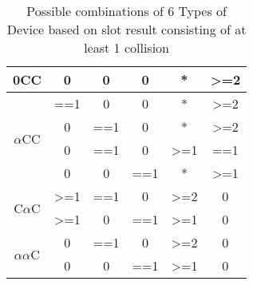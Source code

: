 \documentclass[fleqn]{article}
\begin{document}
\begin {table} [h]
\begin{tabular}{|c|c|c|c|c|c|}
\multicolumn{1}{|c|}{0CC}                                & \multicolumn{1}{c|}{0}                & \multicolumn{1}{c|}{0}                & \multicolumn{1}{c|}{0}   & \multicolumn{1}{c|}{*}                & \multicolumn{1}{c|}{\textgreater{}=2} \\ \hline
\multicolumn{1}{|c|}{\multirow{4}{*}{$\alpha$CC}}        & \multicolumn{1}{c|}{==1}              & \multicolumn{1}{c|}{0}                & \multicolumn{1}{c|}{0}   & \multicolumn{1}{c|}{*}                & \multicolumn{1}{c|}{\textgreater{}=2} \\ \cline{2-6} 
\multicolumn{1}{|c|}{}                                   & \multicolumn{1}{c|}{0}                & \multicolumn{1}{c|}{==1}              & \multicolumn{1}{c|}{0}   & \multicolumn{1}{c|}{*}                & \multicolumn{1}{c|}{\textgreater{}=2} \\ \cline{2-6} 
\multicolumn{1}{|c|}{}                                   & \multicolumn{1}{c|}{0}                & \multicolumn{1}{c|}{==1}              & \multicolumn{1}{c|}{0}   & \multicolumn{1}{c|}{\textgreater{}=1} & \multicolumn{1}{c|}{==1}              \\ \cline{2-6} 
\multicolumn{1}{|c|}{}                                   & \multicolumn{1}{c|}{0}                & \multicolumn{1}{c|}{0}                & \multicolumn{1}{c|}{==1} & \multicolumn{1}{c|}{*}                & \multicolumn{1}{c|}{\textgreater{}=1} \\ \hline
\multicolumn{1}{|c|}{\multirow{2}{*}{C$\alpha$C}}        & \multicolumn{1}{c|}{\textgreater{}=1} & \multicolumn{1}{c|}{==1}              & \multicolumn{1}{c|}{0}   & \multicolumn{1}{c|}{\textgreater{}=2} & \multicolumn{1}{c|}{0}                \\ \cline{2-6} 
\multicolumn{1}{|c|}{}                                   & \multicolumn{1}{c|}{\textgreater{}=1} & \multicolumn{1}{c|}{0}                & \multicolumn{1}{c|}{==1} & \multicolumn{1}{c|}{\textgreater{}=1} & \multicolumn{1}{c|}{0}                \\ \hline
\multicolumn{1}{|c|}{\multirow{2}{*}{$\alpha$$\alpha$C}} & \multicolumn{1}{c|}{0}                & \multicolumn{1}{c|}{==1}              & \multicolumn{1}{c|}{0}   & \multicolumn{1}{c|}{\textgreater{}=2} & \multicolumn{1}{c|}{0}                \\ \cline{2-6} 
\multicolumn{1}{|c|}{}                                   & \multicolumn{1}{c|}{0}                & \multicolumn{1}{c|}{0}                & \multicolumn{1}{c|}{==1} & \multicolumn{1}{c|}{\textgreater{}=1} & \multicolumn{1}{c|}{0}                \\ \hline
\end{tabular}

\caption{Possible combinations of 6 Types of Device based on slot result consisting of at least 1 collision}
\label{Tab8_3C}
\end{table}
\end{document}
